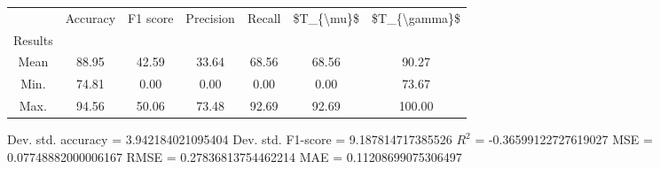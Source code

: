 \begin{tabular}{|c|c|c|c|c|c|c|}
\toprule
{} &  Accuracy &  F1 score &  Precision &  Recall &  \$T\_\{\textbackslash mu\}\$ &  \$T\_\{\textbackslash gamma\}\$ \\
Results &           &           &            &         &            &               \\
\hline
Mean    &     88.95 &     42.59 &      33.64 &   68.56 &      68.56 &         90.27 \\
Min.    &     74.81 &      0.00 &       0.00 &    0.00 &       0.00 &         73.67 \\
Max.    &     94.56 &     50.06 &      73.48 &   92.69 &      92.69 &        100.00 \\
\bottomrule
\end{tabular}

 Dev. std. accuracy = 3.942184021095404
 Dev. std. F1-score = 9.187814717385526
 $R^2$ = -0.36599122727619027
 MSE = 0.07748882000006167
 RMSE = 0.27836813754462214
 MAE = 0.11208699075306497